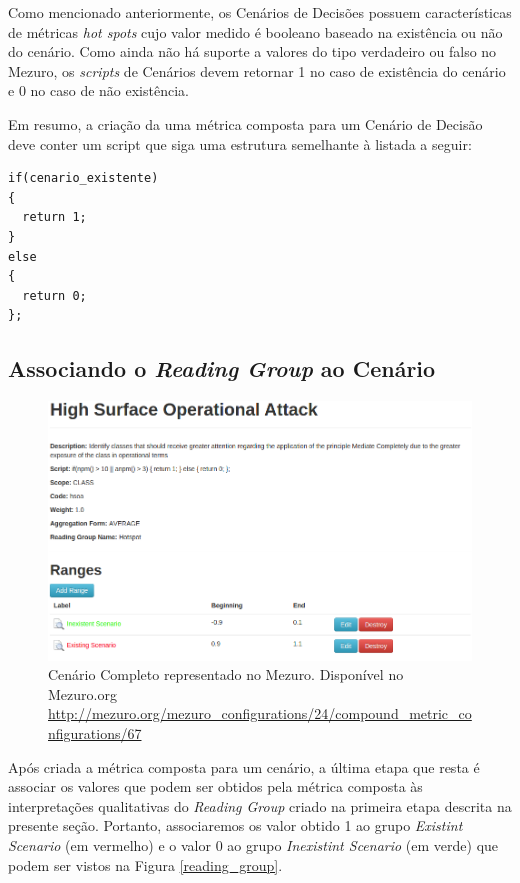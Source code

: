 Como mencionado anteriormente, os Cenários de Decisões possuem características de métricas \emph{hot spots} cujo valor medido é booleano baseado na existência ou não do cenário. Como ainda não há suporte a valores do tipo verdadeiro ou falso no Mezuro, os \emph{scripts} de Cenários devem retornar 1 no caso de existência do cenário e 0 no caso de não existência.

Em resumo, a criação da uma métrica composta para um Cenário de Decisão deve conter um script que siga uma estrutura semelhante à listada a seguir:

\begin{lstlisting}[caption={Estrutura de script básica para Cenários de Decisões}, label=script_example]
if(cenario_existente)
{
  return 1;
}
else
{
  return 0;
};
\end{lstlisting}

\subsection{Associando o \emph{Reading Group} ao Cenário}

\graphicspath{{figuras/}}
\begin{figure}[h]
\centering
\includegraphics[width=1.0\textwidth]{cenario_completo}
\caption{Cenário Completo representado no Mezuro. Disponível no Mezuro.org \url{http://mezuro.org/mezuro_configurations/24/compound_metric_configurations/67}}
\label{cenario_completo}
\end{figure}

Após criada a métrica composta para um cenário, a última etapa que resta é associar os valores que podem ser obtidos pela métrica composta às interpretações qualitativas do \emph{Reading Group} criado na primeira etapa descrita na presente seção. Portanto, associaremos os valor obtido 1 ao grupo \emph{Existint Scenario} (em vermelho) e o valor 0 ao grupo \emph{Inexistint Scenario} (em verde) que podem ser vistos na Figura \ref{reading_group}.

